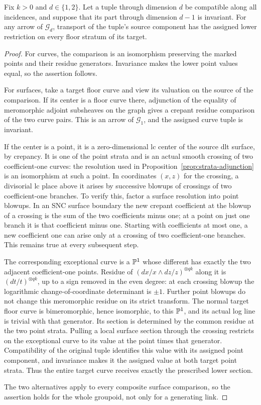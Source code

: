 \begin{lemma}\label{lem:transport-lower-restrictions}
Fix \(k>0\) and \(d\in\{1,2\}\).  Let a tuple through dimension \(d\)
be compatible along all incidences, and suppose that its part through
dimension \(d-1\) is invariant.  For any arrow of \(\mathcal G_d\),
transport of the tuple's source component has the assigned lower
restriction on every floor stratum of its target.
\end{lemma}
\begin{proof}
For curves, the comparison is an isomorphism preserving the marked points
and their residue generators.  Invariance makes the lower point values
equal, so the assertion follows.

For surfaces, take a target floor curve and view its valuation on the
source of the comparison.  If its center is a floor curve there,
adjunction of the equality of meromorphic adjoint subsheaves on the graph
gives a crepant residue comparison of the two curve pairs.  This is an
arrow of \(\mathcal G_1\), and the assigned curve tuple is invariant.

If the center is a point, it is a zero-dimensional lc center of the
source dlt surface, by crepancy.  It is one of the point strata and is an
actual smooth crossing of two coefficient-one curves: the resolution
used in Proposition~\ref{prop:strata-adjunction} is an isomorphism at
such a point.  In coordinates \((x,z)\) for the crossing, a divisorial
lc place above it arises by successive blowups of crossings of two
coefficient-one branches.  To verify this, factor a surface resolution
into point blowups.  In an SNC surface boundary the new crepant
coefficient at the blowup of a crossing is the sum of the two coefficients
minus one; at a point on just one branch it is that coefficient minus one.
Starting with coefficients at most one, a new coefficient one can arise
only at a crossing of two coefficient-one branches.  This remains true
at every subsequent step.

The corresponding exceptional curve is a \(\mathbb P^1\) whose different has
exactly the two adjacent coefficient-one points.  Residue of
\((dx/x\wedge dz/z)^{\otimes qk}\) along it is
\((dt/t)^{\otimes qk}\), up to a sign removed in the even degree: at each
crossing blowup the logarithmic change-of-coordinate determinant is
\(\pm1\).  Further point blowups do not change this meromorphic residue
on its strict transform.  The normal target floor curve is bimeromorphic,
hence isomorphic, to this \(\mathbb P^1\), and its actual log line is trivial
with that generator.  Its section is determined by the common residue at
the two point strata.  Pulling a local surface section through the crossing
restricts on the exceptional curve to its value at the point times that
generator.  Compatibility of the original tuple identifies this value
with its assigned point component, and invariance makes it the assigned
value at both target point strata.  Thus the entire target curve receives
exactly the prescribed lower section.

The two alternatives apply to every composite surface comparison, so the
assertion holds for the whole groupoid, not only for a generating link.
\end{proof}

